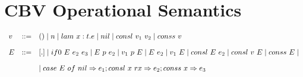 \documentclass{article}
\begin{document}
\section{CBV Operational Semantics}

$\begin{array}{l c l}
  v    & ::= & () \mid n \mid lam~x:t.e \mid nil \mid consl~v_1~v_2 \mid conss~v\\[1em]
  E    & ::= & [.] \mid if0~E~e_2~e_3 \mid E~p~e_2 \mid v_1~p~E \mid E~e_2 \mid v_1~E \mid consl~E~e_2 \mid consl~v~E \mid conss~E \mid\\[1em] 
       &     &  \mid case~E~of~nil \Rightarrow e_1; consl~x~rx \Rightarrow e_2; conss~x \Rightarrow e_3\\[1em]
\end{array}$



 
\end{document}
